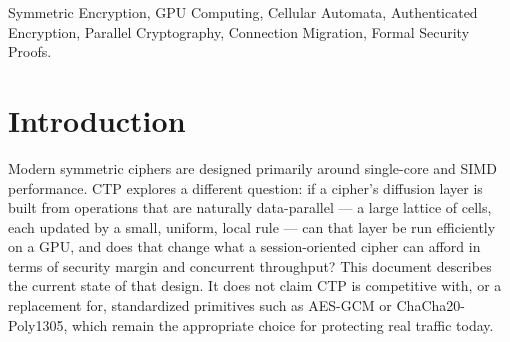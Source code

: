\documentclass[twocolumn,10pt,journal,compsoc]{IEEEtran}
\begin{document}
\begin{abstract}
below. Despite the internal GPU speedup, CTP's absolute keystream-extraction throughput (under 1 Gbps aggregate at the largest scale tested) remains one to two orders of magnitude below a single CPU core running contemporary hardware-accelerated AES-256-GCM or ChaCha20-Poly1305, and several further orders of magnitude below dedicated hardware offload; this comparison is reported explicitly rather than left for the reader to infer. This draft states plainly what has and has not been established: correctness of every cryptographic construction described here has been verified against independent references; the performance results are measured on one GPU configuration, not characterized broadly; the formal security argument is conditional on assumptions no third party has reviewed; and no third-party cryptanalysis has been performed. CTP should be treated as a research artifact, not a candidate for protecting real data.
\end{abstract}

\begin{IEEEkeywords}
Symmetric Encryption, GPU Computing, Cellular Automata, Authenticated Encryption, Parallel Cryptography, Connection Migration, Formal Security Proofs.
\end{IEEEkeywords}

\section{Introduction}
Modern symmetric ciphers are designed primarily around single-core and SIMD performance. CTP explores a different question: if a cipher's diffusion layer is built from operations that are naturally data-parallel --- a large lattice of cells, each updated by a small, uniform, local rule --- can that layer be run efficiently on a GPU, and does that change what a session-oriented cipher can afford in terms of security margin and concurrent throughput? This document describes the current state of that design. It does not claim CTP is competitive with, or a replacement for, standardized primitives such as AES-GCM or ChaCha20-Poly1305, which remain the appropriate choice for protecting real traffic today.
\end{document}
